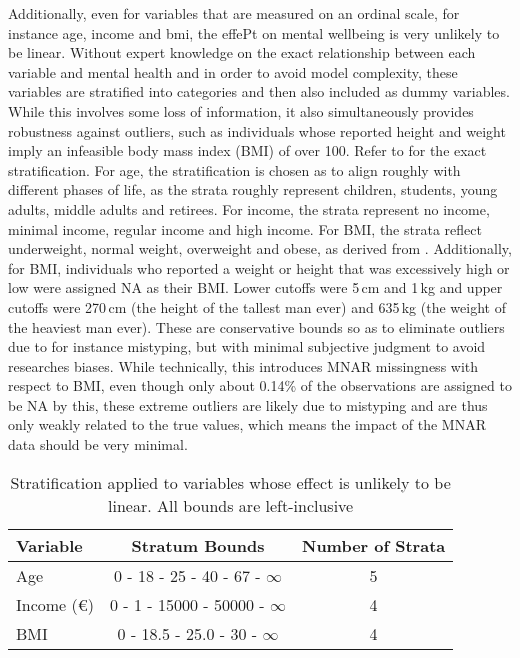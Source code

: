 Additionally, even for variables that are measured on an ordinal scale, for instance age, income and bmi, the effePt on mental wellbeing is very unlikely to
be linear. Without expert knowledge on the exact relationship between each variable
and mental health and in order to avoid model complexity, these variables are stratified into categories and then also
included as dummy variables. While this involves some loss of information, it also simultaneously provides robustness
against outliers, such as individuals whose reported height and weight imply an infeasible body mass index (BMI) of over 100.
Refer to  for the exact stratification.
For age, the stratification is chosen as to align roughly with different phases of life, as the strata roughly represent
children, students, young adults, middle adults and retirees.
For income, the strata represent no income, minimal income, regular income and high income.
For BMI, the strata reflect underweight, normal weight, overweight and obese, as derived from .
Additionally, for BMI, individuals who reported a weight or height that was excessively high or low were assigned NA as their BMI.
Lower cutoffs were 5\,cm and 1\,kg and upper cutoffs were 270\,cm (the height of the tallest man ever) and 635\,kg
(the weight of the heaviest man ever). These are conservative bounds so as to eliminate outliers due to for instance
mistyping, but with minimal subjective judgment to avoid researches biases.
While technically, this introduces MNAR missingness with respect to BMI, even though only about 0.14\% of the observations are
assigned to be NA by this, these extreme outliers are likely due to mistyping and are thus only weakly related to the
true values, which means the impact of the MNAR data should be very minimal.

\begin{table}[htbp]
    \centering
    \caption{Stratification applied to variables whose effect is unlikely to be linear. All bounds are left-inclusive}
    \label{tab:data:stratification}
    \begin{tabular}{l|c|c}
        Variable & Stratum Bounds & Number of Strata \\
        \hline
        Age        & 0 \hfill- \hfill18 \hfill- \hfill25 \hfill- \hfill40 \hfill- \hfill67 \hfill- \hfill$ \infty$ & 5  \\
        Income (€) & 0 \hfill- \hfill1 \hfill- \hfill15000 \hfill- \hfill50000 \hfill- \hfill$ \infty$ & 4  \\
        BMI        & 0 \hfill- \hfill18.5 \hfill- \hfill25.0 \hfill- \hfill30 \hfill- \hfill$ \infty$  & 4  \\
    \end{tabular}
\end{table}

